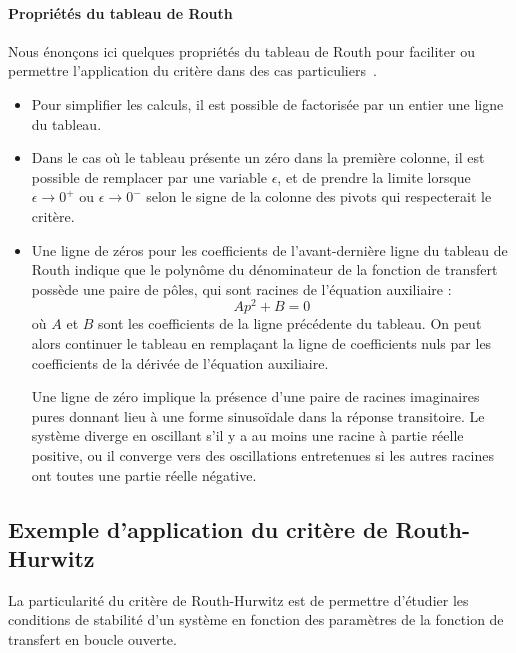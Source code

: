 \paragraph{Propriétés du tableau de Routh}
Nous énonçons ici quelques propriétés du tableau de Routh 
pour faciliter ou permettre l'application du critère dans 
des cas particuliers~\cite{Ostertag}. 
\begin{itemize}
    \item Pour simplifier les calculs, il est possible de factorisée par un 
          entier une ligne du tableau.
    \item Dans le cas où le tableau présente un zéro dans la première 
          colonne, il est possible de remplacer par une variable $\epsilon$, 
          et de prendre la limite lorsque $\epsilon\rightarrow 0^+$ ou 
          $\epsilon\rightarrow 0^-$ selon le signe de la colonne des pivots
          qui respecterait le critère.
    \item Une ligne de zéros pour les coefficients de l'avant-dernière ligne 
          du tableau de Routh indique que le polynôme du dénominateur de la 
          fonction de transfert possède une paire de pôles, qui sont racines de 
          l'équation auxiliaire :
    \[
        Ap^2+B=0
    \]
    où $A$ et $B$ sont les coefficients de la ligne précédente du tableau. 
    On peut alors continuer le tableau en remplaçant la ligne de coefficients 
    nuls par les coefficients de la dérivée de l'équation auxiliaire. 
    
    Une ligne de zéro implique la présence d'une paire de racines imaginaires 
    pures donnant lieu à une forme sinuso\"idale dans la réponse transitoire.
    Le système diverge en oscillant s'il y a au moins une racine à partie 
    réelle positive, ou il converge vers des oscillations entretenues si les 
    autres racines ont toutes une partie réelle négative.
\end{itemize}
\subsection{Exemple d'application du critère de Routh-Hurwitz}
La particularité du critère de Routh-Hurwitz est de permettre d'étudier les 
conditions de stabilité d'un système en fonction des paramètres de la fonction 
de transfert en boucle ouverte.

